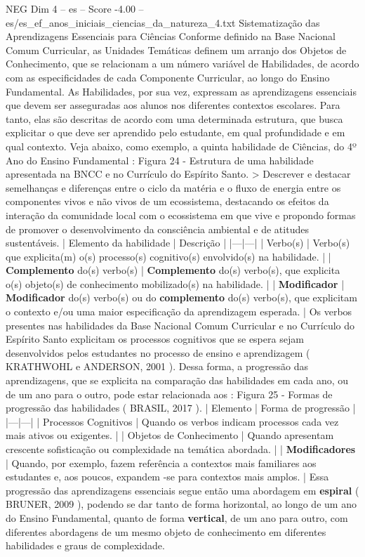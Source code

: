 \begin{textsample}{NEG Dim 4 – es – Score -4.00 – es/es\_ef\_anos\_iniciais\_ciencias\_da\_natureza\_4.txt}  \label{ex:f4_neg_213}
Sistematização das Aprendizagens Essenciais para Ciências Conforme definido na Base Nacional Comum Curricular, as Unidades Temáticas definem um arranjo dos Objetos de Conhecimento, que se relacionam a um número variável de Habilidades, de acordo com as especificidades de cada Componente Curricular, ao longo do Ensino Fundamental.
As Habilidades, por sua vez, expressam as aprendizagens essenciais que devem ser asseguradas aos alunos nos diferentes contextos escolares.
Para tanto, elas são descritas de acordo com uma determinada estrutura, que busca explicitar o que deve ser aprendido pelo estudante, em qual profundidade e em qual contexto.
Veja abaixo, como exemplo, a quinta habilidade de Ciências, do 4º Ano do Ensino Fundamental : Figura 24 - Estrutura de uma habilidade apresentada na BNCC e no Currículo do Espírito Santo. > Descrever e destacar semelhanças e diferenças entre o ciclo da matéria e o fluxo de energia entre os componentes vivos e não vivos de um ecossistema, destacando os efeitos da interação da comunidade local com o ecossistema em que vive e propondo formas de promover o desenvolvimento da consciência ambiental e de atitudes sustentáveis. | Elemento da habilidade | Descrição | |---|---| | Verbo(s) | Verbo(s) que explicita(m) o(s) processo(s) cognitivo(s) envolvido(s) na habilidade. | | \textbf{Complemento} do(s) verbo(s) | \textbf{Complemento} do(s) verbo(s), que explicita o(s) objeto(s) de conhecimento mobilizado(s) na habilidade. | | \textbf{Modificador} | \textbf{Modificador} do(s) verbo(s) ou do \textbf{complemento} do(s) verbo(s), que explicitam o contexto e/ou uma maior especificação da aprendizagem esperada. | Os verbos presentes nas habilidades da Base Nacional Comum Curricular e no Currículo do Espírito Santo explicitam os processos cognitivos que se espera sejam desenvolvidos pelos estudantes no processo de ensino e aprendizagem ( KRATHWOHL e ANDERSON, 2001 ).
Dessa forma, a progressão das aprendizagens, que se explicita na comparação das habilidades em cada ano, ou de um ano para o outro, pode estar relacionada aos : Figura 25 - Formas de progressão das habilidades ( BRASIL, 2017 ). | Elemento | Forma de progressão | |---|---| | Processos Cognitivos | Quando os verbos indicam processos cada vez mais ativos ou exigentes. | | Objetos de Conhecimento | Quando apresentam crescente sofisticação ou complexidade na temática abordada. | | \textbf{Modificadores} | Quando, por exemplo, fazem referência a contextos mais familiares aos estudantes e, aos poucos, expandem -se para contextos mais amplos. | Essa progressão das aprendizagens essenciais segue então uma abordagem em \textbf{espiral} ( BRUNER, 2009 ), podendo se dar tanto de forma horizontal, ao longo de um ano do Ensino Fundamental, quanto de forma \textbf{vertical}, de um ano para outro, com diferentes abordagens de um mesmo objeto de conhecimento em diferentes habilidades e graus de complexidade.

\end{textsample}

